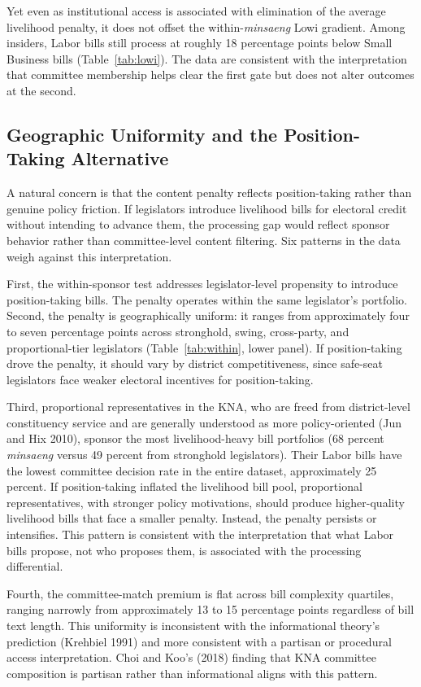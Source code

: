 \documentclass[11pt]{article}
\begin{document}
Yet even as institutional access is associated with elimination of the average livelihood penalty, it does not offset the within-\emph{minsaeng} Lowi gradient. Among insiders, Labor bills still process at roughly 18 percentage points below Small Business bills (Table~\ref{tab:lowi}). The data are consistent with the interpretation that committee membership helps clear the first gate but does not alter outcomes at the second.

\subsection{Geographic Uniformity and the Position-Taking Alternative}\label{sec:geo}

A natural concern is that the content penalty reflects position-taking rather than genuine policy friction. If legislators introduce livelihood bills for electoral credit without intending to advance them, the processing gap would reflect sponsor behavior rather than committee-level content filtering. Six patterns in the data weigh against this interpretation.

First, the within-sponsor test addresses legislator-level propensity to introduce position-taking bills. The penalty operates within the same legislator's portfolio. Second, the penalty is geographically uniform: it ranges from approximately four to seven percentage points across stronghold, swing, cross-party, and proportional-tier legislators (Table~\ref{tab:within}, lower panel). If position-taking drove the penalty, it should vary by district competitiveness, since safe-seat legislators face weaker electoral incentives for position-taking.

Third, proportional representatives in the KNA, who are freed from district-level constituency service and are generally understood as more policy-oriented (Jun and Hix 2010), sponsor the most livelihood-heavy bill portfolios (68 percent \emph{minsaeng} versus 49 percent from stronghold legislators). Their Labor bills have the lowest committee decision rate in the entire dataset, approximately 25 percent. If position-taking inflated the livelihood bill pool, proportional representatives, with stronger policy motivations, should produce higher-quality livelihood bills that face a smaller penalty. Instead, the penalty persists or intensifies. This pattern is consistent with the interpretation that what Labor bills propose, not who proposes them, is associated with the processing differential.

Fourth, the committee-match premium is flat across bill complexity quartiles, ranging narrowly from approximately 13 to 15 percentage points regardless of bill text length. This uniformity is inconsistent with the informational theory's prediction (Krehbiel 1991) and more consistent with a partisan or procedural access interpretation. Choi and Koo's (2018) finding that KNA committee composition is partisan rather than informational aligns with this pattern.
\end{document}
